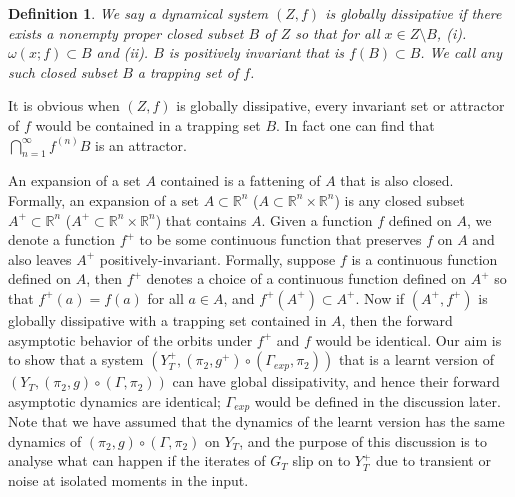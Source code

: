 \documentclass[12 pt]{article}
\newtheorem{Definition}{Definition}[]
\begin{document}

 
\begin{Definition} \rm
	We say a dynamical system $(Z,f)$ is globally dissipative if there exists a nonempty proper closed subset $B$ of $Z$  so that for all $x\in Z\setminus B$, (i). $\omega(x;f) \subset B$  and (ii).  $B$ is positively invariant that is $f(B) \subset B$. We call any such closed subset $B$ a trapping set of $f$. 
\end{Definition}

It is obvious when $(Z,f)$ is globally dissipative, every invariant set or attractor of $f$ would be contained in a trapping set $B$. In fact one can find that $\bigcap_{n=1}^\infty f^{(n)}B$ is an
attractor.  

An expansion of a set $A$ contained is a fattening of $A$ that is also closed. Formally, an expansion of a set $A \subset \mathbb{R}^n$ ($A \subset \mathbb{R}^n \times \mathbb{R}^n$) is any closed subset $A^+ \subset \mathbb{R}^n$ ($A^+ \subset \mathbb{R}^n \times \mathbb{R}^n$) that  contains $A$. 
Given a function $f$ defined on $A$, we denote a function $f^+$ to be some continuous function that preserves $f$ on $A$ and also leaves $A^+$ positively-invariant. Formally, suppose $f$ is a continuous function defined on $A$, then $f^+$ denotes a choice of a continuous function defined on $A^+$ so that $f^+(a)=f(a)$ for all $a \in A$, and  $f^+(A^+) \subset A^+$. Now if $(A^+,f^+)$ is globally dissipative with a trapping set contained in $A$, then the forward asymptotic behavior of the orbits under $f^+$ and $f$ would be identical. Our aim is to show that a system $(Y_T^+, (\pi_2,g^+) \circ (\Gamma_{exp},\pi_2))$ that is a learnt version of $(Y_T,(\pi_2,g) \circ (\Gamma,\pi_2))$ can have global dissipativity, and hence their forward asymptotic dynamics are identical; $\Gamma_{exp}$ would be defined in the discussion later. Note that we have assumed that the dynamics of the learnt version has the same dynamics of $(\pi_2,g) \circ (\Gamma,\pi_2)$ on $Y_T$, and the purpose of this discussion is to analyse what can happen if the iterates of $G_T$ slip on to  $Y_T^+$ due to transient or noise at isolated moments in the input. 
\end{document}
